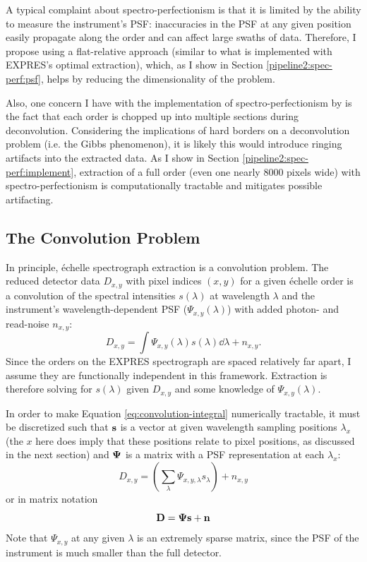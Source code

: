 A typical complaint about spectro-perfectionism is that it is limited by the ability to measure the instrument's PSF: inaccuracies in the PSF at any given position easily propagate along the order and can affect large swaths of data. Therefore, I propose using a flat-relative approach (similar to what is implemented with EXPRES's optimal extraction), which, as I show in Section \ref{pipeline2:spec-perf:psf}, helps by reducing the dimensionality of the problem.

Also, one concern I have with the implementation of spectro-perfectionism by \citet{cornachione_full_2019} is the fact that each order is chopped up into multiple sections during deconvolution. Considering the implications of hard borders on a deconvolution problem (i.e. the Gibbs phenomenon), it is likely this would introduce ringing artifacts into the extracted data. As I show in Section \ref{pipeline2:spec-perf:implement}, extraction of a full order (even one nearly 8000 pixels wide) with spectro-perfectionism is computationally tractable and mitigates possible artifacting.


\subsection{The Convolution Problem} \label{pipeline2:spec-perf:bkgd}

In principle, \'echelle spectrograph extraction is a convolution problem. The reduced detector data $D_{x,y}$ with pixel indices $(x, y)$ for a given \'echelle order is a convolution of the spectral intensities $s(\lambda)$ at wavelength $\lambda$ and the instrument's wavelength-dependent PSF ($\Psi_{x,y}(\lambda)$) with added photon- and read-noise $n_{x,y}$:
\begin{equation}
    D_{x,y} = \int \Psi_{x,y}(\lambda) s(\lambda) \dd{\lambda} + n_{x,y}.
\end{equation}
\label{eq:convolution-integral}
Since the orders on the EXPRES spectrograph are spaced relatively far apart, I assume they are functionally independent in this framework. Extraction is therefore solving for $s(\lambda)$ given $D_{x,y}$ and some knowledge of $\Psi_{x,y}(\lambda)$.

In order to make Equation \ref{eq:convolution-integral} numerically tractable, it must be discretized such that $\vb{s}$ is a vector at given wavelength sampling positions {$\lambda_x$} (the $x$ here does imply that these positions relate to pixel positions, as discussed in the next section) and $\vb{\Psi}$ is a matrix with a PSF representation at each $\lambda_x$:
\begin{equation}
    D_{x,y} = \left( \sum_\lambda \Psi_{x,y,\lambda} s_\lambda \right) + n_{x,y}
    \label{eq:convolution-index}
\end{equation}
or in matrix notation
\begin{equation}
    \vb{D} = \vb{\Psi}\vb{s} + \vb{n}
    \label{eq:convolution-matrix}
\end{equation}
Note that $\Psi_{x,y}$ at any given $\lambda$ is an extremely sparse matrix, since the PSF of the instrument is much smaller than the full detector.

